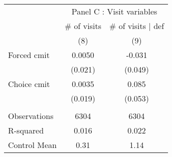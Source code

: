 \begin{tabular}{lcc}
\toprule
      & \multicolumn{2}{c}{Panel C  : Visit variables} \\
\cmidrule{2-3}      & \# of visits & \# of visits $|$ def \\
\midrule
\midrule
      & (8)   & (9) \\
\midrule
\midrule
Forced cmit & 0.0050 & -0.031 \\
      & (0.021) & (0.049) \\
Choice cmit & 0.0035 & 0.085 \\
      & (0.019) & (0.053) \\
      &       &  \\
\midrule
Observations & 6304  & 6304 \\
R-squared & 0.016 & 0.022 \\
Control Mean & 0.31  & 1.14 \\
\bottomrule
\bottomrule
\end{tabular}%

